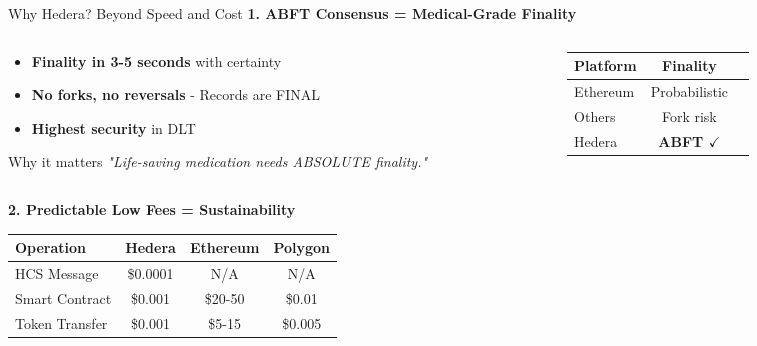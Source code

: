 \documentclass[aspectratio=169,xcolor=dvipsnames,14pt]{beamer}
\newcommand{\checkitem}{\item[\color{SuccessGreen}\faCheckCircle]}
\begin{document}
\begin{frame}[shrink=10]{Why Hedera? Beyond Speed and Cost}
\small
  \textbf{\textcolor{HederaPurple}{1. ABFT Consensus = Medical-Grade Finality}}

  \begin{columns}[T]
    \begin{column}{0.6\textwidth}
      \begin{itemize}
        \checkitem \textbf{Finality in 3-5 seconds} with certainty
        \checkitem \textbf{No forks, no reversals} - Records are FINAL
        \checkitem \textbf{Highest security} in DLT
      \end{itemize}

      \vspace{0.15cm}

      \begin{block}{Why it matters}
        \small
        \textit{"Life-saving medication needs ABSOLUTE finality."}
      \end{block}
    \end{column}

    \begin{column}{0.4\textwidth}
      \begin{table}
        \scriptsize
        \begin{tabular}{lcc}
          \toprule
          \textbf{Platform} & \textbf{Finality} \\
          \midrule
          \textcolor{DangerRed}{Ethereum} & Probabilistic \\
          \textcolor{WarningOrange}{Others} & Fork risk \\
          \textcolor{SuccessGreen}{Hedera} & \textbf{ABFT $\checkmark$} \\
          \bottomrule
        \end{tabular}
      \end{table}
    \end{column}
  \end{columns}

  \vspace{0.2cm}

  \textbf{\textcolor{HederaPurple}{2. Predictable Low Fees = Sustainability}}

  \begin{table}
    \scriptsize
    \begin{tabular}{lccc}
      \toprule
      \textbf{Operation} & \textbf{Hedera} & \textbf{Ethereum} & \textbf{Polygon} \\
      \midrule
      HCS Message & \textcolor{SuccessGreen}{\$0.0001} & N/A & N/A \\
      Smart Contract & \textcolor{SuccessGreen}{\$0.001} & \textcolor{DangerRed}{\$20-50} & \$0.01 \\
      Token Transfer & \textcolor{SuccessGreen}{\$0.001} & \textcolor{DangerRed}{\$5-15} & \$0.005 \\
      \bottomrule
    \end{tabular}
  \end{table}


\end{frame}
\end{document}
